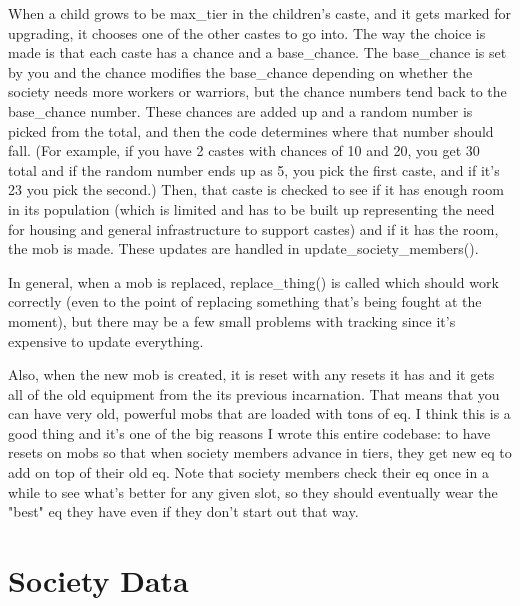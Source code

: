 When a child grows to be max\_tier in the children's caste, and it gets
marked for upgrading, it chooses one of the other castes to go into.
The way the choice is made is that each caste has a chance and a 
base\_chance. The base\_chance is set by you and the chance modifies
the base\_chance depending on whether the society needs more 
workers or warriors, but the chance numbers tend back to the
base\_chance number. These chances are added up and a random number
is picked from the total, and then the code determines where that
number should fall. (For example, if you have 2 castes with chances
of 10 and 20, you get 30 total and if the random number ends up as 5,
you pick the first caste, and if it's 23 you pick the second.) Then,
that caste is checked to see if it has enough room in its population 
(which is limited and has to be built up representing the need for
housing and general infrastructure to support castes) and if it
has the room, the mob is made. These updates are handled in
update\_society\_members().

In general, when a mob is replaced, replace\_thing() is
called which should work correctly (even to the point of replacing
something that's being fought at the moment), but there may be a few
small problems with tracking since it's expensive to update everything.

Also, when the new mob is created, it is reset with any resets it has
and it gets all of the old equipment from the its previous incarnation.
That means that you can have very old, powerful mobs that are loaded
with tons of eq. I think this is a good thing and it's one of the
big reasons I wrote this entire codebase: to have resets on mobs so
that when society members advance in tiers, they get new eq to add
on top of their old eq. Note that society members check their eq
once in a while to see what's better for any given slot, so they
should eventually wear the "best" eq they have even if they don't
start out that way.

\section{Society Data}

